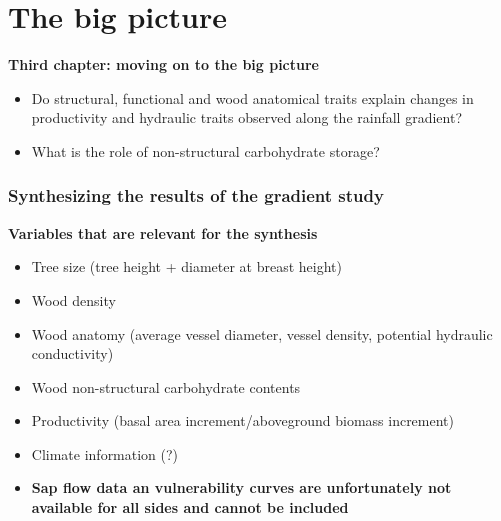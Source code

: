 \documentclass[usepdftitle=false]{beamer}
\newcommand{\Blue}[1]{{\color{blue!50!black}\textbf{#1}}}
\begin{document}
\section{The big picture}
\begin{frame}
	\begin{block}{\textbf{Third chapter: moving on to the big picture}}
		\begin{itemize}
			\item Do structural, functional and wood anatomical traits explain changes in productivity and hydraulic traits observed along the rainfall gradient? 
			\item What is the role of non-structural carbohydrate storage?
		\end{itemize}
	\end{block}	
\end{frame}

\begin{frame}
	\frametitle{Synthesizing the results of the gradient study}	\Blue{Variables that are relevant for the synthesis}
	\begin{itemize}[<+-| alert@+>]
		\item Tree size (tree height + diameter at breast height)
		\item Wood density
		\item Wood anatomy (average vessel diameter, vessel density, potential hydraulic conductivity)
		\item Wood non-structural carbohydrate contents
		\item Productivity (basal area increment/aboveground biomass increment)
		\item Climate information (?)
		\item<visible@+| alert@+> \textbf{Sap flow data an vulnerability curves are unfortunately not available for all sides and cannot be included}		
	\end{itemize}	
\end{frame}
\end{document}
